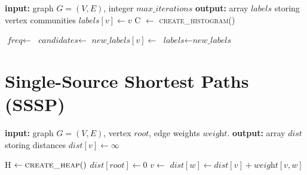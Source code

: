 \begin{algorithm}[h!]
\begin{algorithmic}[1]
\Statex \textbf{input:} graph $G=(V,E)$, integer $\textit{max\_iterations}$
\Statex \textbf{output:} array $\textit{labels}$ storing vertex communities
  \State $\textit{labels}[v] \gets v$
\EndFor
{}
  \State C $\gets$ \textsc{create\_histogram()}

    \State {}
  \EndFor
    \State {}
  \EndFor
  \State $\textit{freq} \gets $ 
  \State $\textit{candidates} \gets$ 
  \State $\textit{new\_labels}[v] \gets$ 
 \EndFor
 \State $\textit{labels} \gets \textit{new\_labels}$
\EndFor
\end{algorithmic}
\end{algorithm}



\section{Single-Source Shortest Paths (SSSP)}

\begin{algorithm}[h!]
\begin{algorithmic}[1]
\Statex \textbf{input:} graph $G=(V,E)$, vertex $\textit{root}$, edge weights $\textit{weight}$.
\Statex \textbf{output:} array $\textit{dist}$ storing distances
  \State $\textit{dist}[v] \gets \infty$
\EndFor

\State H $\gets \Call{create\_heap}{ }$
\State {}
\State $\textit{dist}[\textit{root}] \gets 0$
  \State $v \gets$ 
      \State $\textit{dist}[w] \gets \textit{dist}[v] + \textit{weight}[v,w]$
      \State {}
    \EndIf
  \EndFor
\EndWhile
\end{algorithmic}
\end{algorithm}
